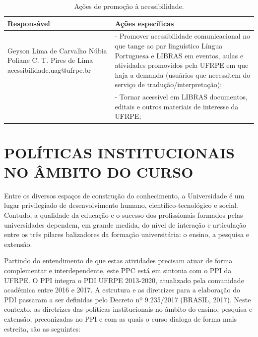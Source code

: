 \documentclass[
	12pt,				%
	openright,			%
  oneside,     %
	a4paper,			%
	chapter=TITLE,		%
	english,			%
	french,				%
	spanish,			%
	brazil				%
	]{abntex2}
\begin{document}
\begin{center}
  
  \begin{scriptsize}
    \begin{longtable}{p{5cm}p{9cm}}
      \caption{\label{quadro:acoes-promocao-acessibilidade}Ações de promoção à acessibilidade.}\\
      \toprule
      \textbf{Responsável} & \textbf{Ações específicas}\\ 
        \midrule
        Geyson Lima de Carvalho \newline Núbia Poliane C. T. Pires de Lima \newline acessibilidade.uag@ufrpe.br
        & - Promover acessibilidade comunicacional no que tange ao par linguístico Língua Portuguesa e LIBRAS em eventos, aulas e atividades promovidos pela UFRPE em que haja a demanda (usuários que necessitem do serviço de tradução/interpretação);\\
        \addlinespace
        & - Tornar acessível em LIBRAS documentos, editais e outros materiais de interesse da UFRPE;\\
        
      \bottomrule
\end{longtable}
\end{scriptsize}      
\end{center}





%
%




\chapter{POLÍTICAS INSTITUCIONAIS NO ÂMBITO DO CURSO}

Entre os diversos espaços de construção do conhecimento, a Universidade é um lugar privilegiado de desenvolvimento humano, científico-tecnológico e social. Contudo, a qualidade da educação e o sucesso dos profissionais formados pelas universidades dependem, em grande medida, do nível de interação e articulação entre os três pilares balizadores da formação universitária: o ensino, a pesquisa e extensão.

Partindo do entendimento de que estas atividades precisam atuar de forma complementar e interdependente, este PPC está em sintonia com o PPI da UFRPE. O PPI integra o PDI UFRPE 2013-2020, atualizado pela comunidade acadêmica entre 2016 e 2017. A estrutura e as diretrizes para a elaboração do PDI passaram a ser definidas pelo Decreto nº 9.235/2017 (BRASIL, 2017). Neste contexto, as diretrizes das políticas institucionais no âmbito do ensino, pesquisa e extensão, preconizadas no PPI e com as quais o curso dialoga de forma mais estreita, são as seguintes:
\end{document}
